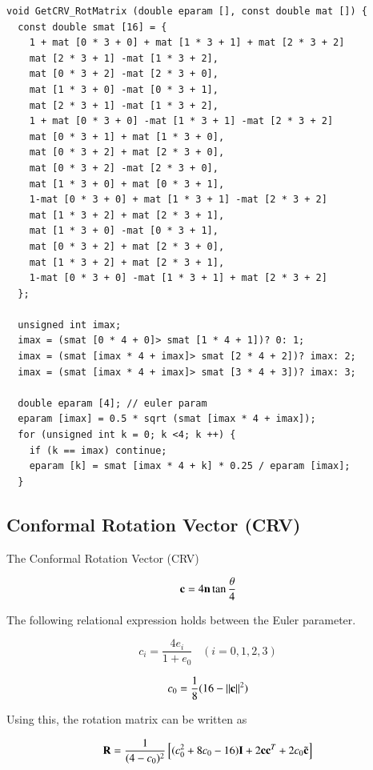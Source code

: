 \begin{lstlisting}
void GetCRV_RotMatrix (double eparam [], const double mat []) {
  const double smat [16] = {
    1 + mat [0 * 3 + 0] + mat [1 * 3 + 1] + mat [2 * 3 + 2]
    mat [2 * 3 + 1] -mat [1 * 3 + 2],
    mat [0 * 3 + 2] -mat [2 * 3 + 0],
    mat [1 * 3 + 0] -mat [0 * 3 + 1],
    mat [2 * 3 + 1] -mat [1 * 3 + 2],
    1 + mat [0 * 3 + 0] -mat [1 * 3 + 1] -mat [2 * 3 + 2]
    mat [0 * 3 + 1] + mat [1 * 3 + 0],
    mat [0 * 3 + 2] + mat [2 * 3 + 0],
    mat [0 * 3 + 2] -mat [2 * 3 + 0],
    mat [1 * 3 + 0] + mat [0 * 3 + 1],
    1-mat [0 * 3 + 0] + mat [1 * 3 + 1] -mat [2 * 3 + 2]
    mat [1 * 3 + 2] + mat [2 * 3 + 1],
    mat [1 * 3 + 0] -mat [0 * 3 + 1],
    mat [0 * 3 + 2] + mat [2 * 3 + 0],
    mat [1 * 3 + 2] + mat [2 * 3 + 1],
    1-mat [0 * 3 + 0] -mat [1 * 3 + 1] + mat [2 * 3 + 2]
  };

  unsigned int imax;
  imax = (smat [0 * 4 + 0]> smat [1 * 4 + 1])? 0: 1;
  imax = (smat [imax * 4 + imax]> smat [2 * 4 + 2])? imax: 2;
  imax = (smat [imax * 4 + imax]> smat [3 * 4 + 3])? imax: 3;

  double eparam [4]; // euler param
  eparam [imax] = 0.5 * sqrt (smat [imax * 4 + imax]);
  for (unsigned int k = 0; k <4; k ++) {
    if (k == imax) continue;
    eparam [k] = smat [imax * 4 + k] * 0.25 / eparam [imax];
  }
\end{lstlisting}


\subsection{Conformal Rotation Vector (CRV)}

The Conformal Rotation Vector (CRV)

\begin{equation}
\mathbf{c}=4\mathbf{n}\tan\frac{\theta}{4}
\end{equation}

The following relational expression holds between the Euler parameter.

\begin{equation}
c_i = \frac{4e_i}{1+e_0}\;\;\; ( i=0,1,2,3)
\end{equation}


\begin{equation}
c_0 = \frac{1}{8}(16-||\mathbf{c}||^2)
\end{equation}

Using this, the rotation matrix can be written as

\begin{tcolorbox}[title=rotation matrix]
\begin{equation}
\mathbf{R} = \frac{1}{(4-c_0)^2}\left[(c_0^2+8c_0-16)\mathbf{I} + 2\mathbf{c}\mathbf{c}^T + 2c_0\tilde{\mathbf{c}}\right]
\end{equation}
\end{tcolorbox}

